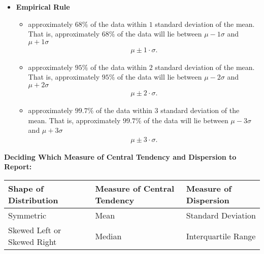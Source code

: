 \documentclass{report}
\begin{document}
\begin{itemize}
        \item \textbf{Empirical Rule}
          \begin{itemize}
             \item approximately $68\% $ of the data within $1 $ standard deviation of the mean. That is, approximately $68\% $  of the data will lie between $\mu-1 \sigma $ and $\mu + 1 \sigma $ 
               \begin{align*}
                 \mu \pm 1\cdot \sigma
               .\end{align*}
             \item approximately $95\% $ of the data within $2 $ standard deviation of the mean. That is, approximately $95\% $  of the data will lie between $\mu-2 \sigma $ and $\mu + 2 \sigma $ 
               \begin{align*}
                 \mu \pm 2 \cdot \sigma
               .\end{align*}
             \item approximately $99.7\% $ of the data within $3 $ standard deviation of the mean. That is, approximately $99.7\% $  of the data will lie between $\mu-3 \sigma $ and $\mu + 3 \sigma $ 
               \begin{align*}
                 \mu \pm 3 \cdot \sigma
               .\end{align*}
           \end{itemize}
        \end{itemize}





               \pagebreak \bigbreak \noindent
       \textbf{Deciding Which Measure of Central Tendency and Dispersion to Report:}
       \bigbreak \noindent 
       \begin{center}
           \begin{tabular}{|l|l|l|}
            \hline
            Shape of Distribution & Measure of Central Tendency & Measure of Dispersion \\
            \hline
            Symmetric & Mean & Standard Deviation \\
            \hline
            Skewed Left or Skewed Right & Median & Interquartile Range \\
            \hline
            \end{tabular}
       \end{center}
       \bigbreak \noindent 
\end{document}
